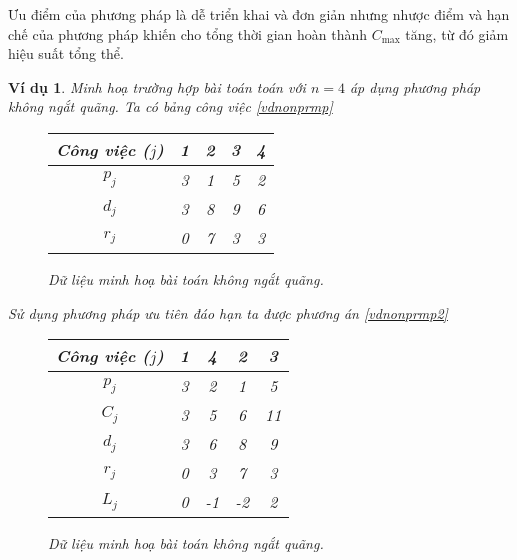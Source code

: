 \documentclass[12pt,a4paper]{report}
\newtheorem{vd}{Ví dụ}
\begin{document}
Ưu điểm của phương pháp là dễ triển khai và đơn giản nhưng nhược điểm và hạn chế của phương pháp khiến cho tổng thời gian hoàn thành $C_{\max}$ tăng, từ đó giảm hiệu suất tổng thể.
\begin{vd} \label{kongatquang}
Minh hoạ trường hợp bài toán toán với $n=4$ áp dụng phương pháp không ngắt quãng.
Ta có bảng công việc \eqref{vdnonprmp}

\begin{figure}[h!]
	\centering
		\begin{tabular}{|c | c c c c |} 
		\hline
		Công việc ($j$) & 1 & 2 & 3 & 4 \\
		\hline\hline
		$p_j$ & 3 & 1 & 5 & 2 \\
		\hline
		$d_j$ & 3 & 8 & 9 & 6 \\
		\hline
		$r_j$ & 0 & 7 & 3 & 3 \\
		\hline
		\end{tabular}
\caption{\label{vdnonprmp} Dữ liệu minh hoạ bài toán không ngắt quãng.}
\end{figure}

Sử dụng phương pháp ưu tiên đáo hạn ta được phương án \eqref{vdnonprmp2}
\begin{figure}[h!]
	\centering
		\begin{tabular}{|c | c c c c |} 
		\hline
		Công việc ($j$) & 1 & 4 & 2 & 3 \\
		\hline\hline
		$p_j$ & 3 & 2 & 1 & 5 \\
		\hline
		$C_j$ & 3 & 5 & 6 & 11 \\
		\hline
		$d_j$ & 3 & 6 & 8 & 9 \\
		\hline
		$r_j$ & 0 & 3 & 7 & 3 \\
		\hline
		$L_j$ & 0 & -1 & -2 & 2 \\
		\hline
		\end{tabular}
\caption{\label{vdnonprmp2} Dữ liệu minh hoạ bài toán không ngắt quãng.}
\end{figure}


\end{vd}
\end{document}
